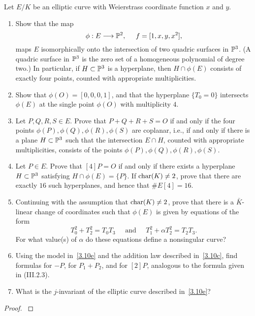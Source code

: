 \documentclass[12pt,reqno]{amsart}
\begin{document}
\begin{exe}\label{3.10}
Let $E/K$ be an elliptic curve with Weierstrass coordinate function $x$ and $y$.
\begin{enumerate}
\item\label{3.10a}
Show that the map
\[
\phi : E \longrightarrow {\mathbb P}^2, \;\;\;\;\;f=[1, x, y, x^2],
\]
maps $E$ isomorphically onto the intersection of two quadric surfaces in ${\mathbb P}^3$.  (A quadric surface in ${\mathbb P}^3$ is the zero set of a homogeneous polynomial of degree two.)  In particular, if $H \subset {\mathbb P}^3$ is a hyperplane, then $H \cap \phi(E)$ consists of exactly four points, counted with appropriate multiplicities.

\item\label{3.10b}
Show that $\phi(O)=[0, 0, 0, 1]$, and that the hyperplane $\{T_0=0\}$ intersects $\phi(E)$ at the single point $\phi(O)$ with multiplicity $4$.

\item\label{3.10c}
Let $P, Q, R, S \in E$.  Prove that $P+Q+R+S=O$ if and only if the four points $\phi(P), \phi(Q), \phi(R), \phi(S)$ are coplanar, i.e., if and only  if there is a plane $H \subset {\mathbb P}^3$ such that the intersection $E \cap H$, counted with appropriate multiplicities, consists of the points $\phi(P), \phi(Q), \phi(R), \phi(S)$.

\item\label{3.10d}
Let $P\in E$.  Prove that $[4]P=O$ if and only if there exists a hyperplane $H \subset {\mathbb P}^3$ satisfying $H \cap \phi(E)=\{P\}$.  If ${\operatorname{char}}(K)\neq 2$,  prove that there are exactly $16$ such hyperplanes, and hence that $\#E[4]=16$.

\item\label{3.10e}
Continuing with the assumption that ${\operatorname{char}} (K)\neq 2$, prove that there is a $\bar{K}$-linear change of coordinates such that $\phi(E)$ is given by equations of the form
\[
T_0^2+T_2^2=T_0T_3\;\;\;\;\;\mbox{and}\;\;\;\;\;T_1^2+\alpha T_2^2=T_2T_3.
\]
For what value(s) of $\alpha$ do these equations define a nonsingular curve?

\item\label{3.10f}
Using the model in~\ref{3.10e} and the addition law described in~\ref{3.10c}, find formulas for $-P$, for $P_1+P_2$, and for $[2]P$, analogous to the formula given in (III.2.3).

\item\label{3.10g}
What is the $j$-invariant of the elliptic curve described in~\ref{3.10e}?
\end{enumerate}
\begin{proof}\label{s3.10}

\end{proof} 
\end{exe} 
\end{document}
